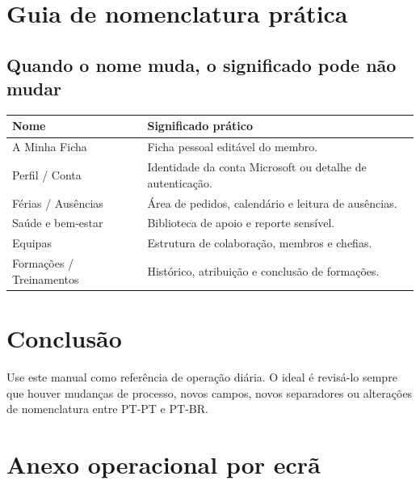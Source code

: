 \chapter{Guia de nomenclatura prática}
\section{Quando o nome muda, o significado pode não mudar}
\begin{longtable}{|p{}|p{}|}
\hline
\textbf{Nome} & \textbf{Significado prático} \\
\hline
A Minha Ficha & Ficha pessoal editável do membro. \\
\hline
Perfil / Conta & Identidade da conta Microsoft ou detalhe de autenticação. \\
\hline
Férias / Ausências & Área de pedidos, calendário e leitura de ausências. \\
\hline
Saúde e bem-estar & Biblioteca de apoio e reporte sensível. \\
\hline
Equipas & Estrutura de colaboração, membros e chefias. \\
\hline
Formações / Treinamentos & Histórico, atribuição e conclusão de formações. \\
\hline
\end{longtable}

\chapter{Conclusão}
Use este manual como referência de operação diária. O ideal é revisá-lo sempre que houver mudanças de processo, novos campos, novos separadores ou alterações de nomenclatura entre PT-PT e PT-BR.

\chapter{Anexo operacional por ecrã}
